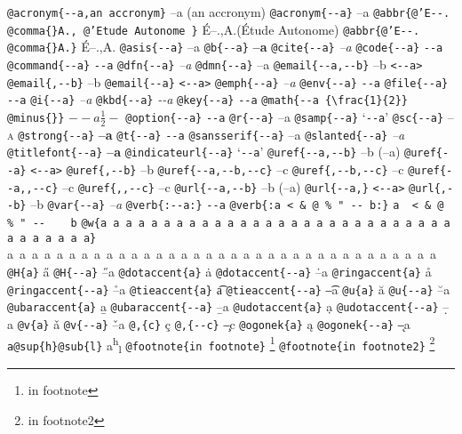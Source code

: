 \documentclass{book}
\begin{document}
\texttt{@acronym\{{-}{-}a,an accronym\}} --a (an accronym)
\texttt{@acronym\{{-}{-}a\}} --a
\texttt{@abbr\{@'E{-}{-}. @comma\{\}A., @'Etude Autonome \}} \'{E}--.\@ ,A.\@ (\'{E}tude Autonome)
\texttt{@abbr\{@'E{-}{-}. @comma\{\}A.\}} \'{E}--.\@ ,A.\@
\texttt{@asis\{{-}{-}a\}} --a
\texttt{@b\{{-}{-}a\}} \textbf{--a}
\texttt{@cite\{{-}{-}a\}} \textit{--a}
\texttt{@code\{{-}{-}a\}} \texttt{{-}{-}a}
\texttt{@command\{{-}{-}a\}} \texttt{{-}{-}a}
\texttt{@dfn\{{-}{-}a\}} \emph{--a}
\texttt{@dmn\{{-}{-}a\}} --a
\texttt{@email\{{-}{-}a,{-}{-}b\}} --b \texttt{<{-}{-}a>}
\texttt{@email\{,{-}{-}b\}} --b
\texttt{@email\{{-}{-}a\}} \texttt{<{-}{-}a>}
\texttt{@emph\{{-}{-}a\}} \emph{--a}
\texttt{@env\{{-}{-}a\}} \texttt{{-}{-}a}
\texttt{@file\{{-}{-}a\}} \texttt{{-}{-}a}
\texttt{@i\{{-}{-}a\}} \textit{--a}
\texttt{@kbd\{{-}{-}a\}} {\ttfamily\textsl{{-}{-}a}}
\texttt{@key\{{-}{-}a\}} \texttt{{-}{-}a}
\texttt{@math\{{-}{-}a \{\textbackslash{}frac\{1\}\{2\}\} @minus\{\}\}} $--a {\frac{1}{2}} -$
\texttt{@option\{{-}{-}a\}} \texttt{{-}{-}a}
\texttt{@r\{{-}{-}a\}} \textrm{--a}
\texttt{@samp\{{-}{-}a\}} `\texttt{{-}{-}a}'
\texttt{@sc\{{-}{-}a\}} \textsc{--a}
\texttt{@strong\{{-}{-}a\}} \textbf{--a}
\texttt{@t\{{-}{-}a\}} \texttt{{-}{-}a}
\texttt{@sansserif\{{-}{-}a\}} \textsf{--a}
\texttt{@slanted\{{-}{-}a\}} \textsl{--a}
\texttt{@titlefont\{{-}{-}a\}} {\Huge \bfseries --a}
\texttt{@indicateurl\{{-}{-}a\}} `\texttt{{-}{-}a}'
\texttt{@uref\{{-}{-}a,{-}{-}b\}} --b (--a)
\texttt{@uref\{{-}{-}a\}} \texttt{<{-}{-}a>}
\texttt{@uref\{,{-}{-}b\}} --b
\texttt{@uref\{{-}{-}a,{-}{-}b,{-}{-}c\}} --c
\texttt{@uref\{,{-}{-}b,{-}{-}c\}} --c
\texttt{@uref\{{-}{-}a,,{-}{-}c\}} --c
\texttt{@uref\{,,{-}{-}c\}} --c
\texttt{@url\{{-}{-}a,{-}{-}b\}} --b (--a)
\texttt{@url\{{-}{-}a,\}} \texttt{<{-}{-}a>}
\texttt{@url\{,{-}{-}b\}} --b
\texttt{@var\{{-}{-}a\}} \emph{--a}
\texttt{@verb\{:{-}{-}a:\}} \verb:--a:
\texttt{@verb\{:a  < \& @ \% " {-}{-}    b:\}} \verb:a  < & @ % " --    b:
\texttt{@w\{a a a a a a a a a a a a a a a a a a a a a a a a a a a a a a a a a a a\}} \hbox{a a a a a a a a a a a a a a a a a a a a a a a a a a a a a a a a a a a}
\texttt{@H\{a\}} \H{a}
\texttt{@H\{{-}{-}a\}} \H{--a}
\texttt{@dotaccent\{a\}} \.{a}
\texttt{@dotaccent\{{-}{-}a\}} \.{--a}
\texttt{@ringaccent\{a\}} \r{a}
\texttt{@ringaccent\{{-}{-}a\}} \r{--a}
\texttt{@tieaccent\{a\}} \t{a}
\texttt{@tieaccent\{{-}{-}a\}} \t{--a}
\texttt{@u\{a\}} \u{a}
\texttt{@u\{{-}{-}a\}} \u{--a}
\texttt{@ubaraccent\{a\}} \b{a}
\texttt{@ubaraccent\{{-}{-}a\}} \b{--a}
\texttt{@udotaccent\{a\}} \d{a}
\texttt{@udotaccent\{{-}{-}a\}} \d{--a}
\texttt{@v\{a\}} \v{a}
\texttt{@v\{{-}{-}a\}} \v{--a}
\texttt{@,\{c\}} \c{c}
\texttt{@,\{{-}{-}c\}} \c{--c}
\texttt{@ogonek\{a\}} \k{a}
\texttt{@ogonek\{{-}{-}a\}} \k{--a}
\texttt{a@sup\{h\}@sub\{l\}} a\textsuperscript{h}\textsubscript{l}
\texttt{@footnote\{in footnote\}} \footnote{in footnote}
\texttt{@footnote\{in footnote2\}} \footnote{in footnote2}
\end{document}
